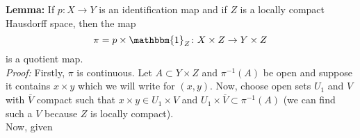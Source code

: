 \documentclass[a4paper]{article}
\begin{document}
    
    

    
    
    
    
 





    \newpage
    
    \textbf{Lemma:} If $p  \colon X \to Y$ is an identification map and if
    $Z$ is a locally compact Hausdorff space, then the map
    \[
    \pi = p \times \mathbbm{1}_{Z}  \colon X \times Z
    \to Y \times Z
    \] 
    is a quotient map.\\
    \linebreak
    \textit{Proof:} Firstly, $\pi$ is continuous. Let
    $A \subset Y \times Z$ and
    $\pi^{-1}(A)$ be open and suppose it contains
    $x \times y$ which we will write for  $(x,y)$.
    Now, choose open sets $U_1$ and $V$ with
    $\overline{V}$ compact such that
    $x \times y \in U_1 \times V$ and
    $U_1 \times \overline{V} \subset \pi^{-1}(A)$ (we can find such a $V$ 
    because $Z$ is locally compact).\\
    Now, given 



    
    
   
    

    
    
\end{document}

